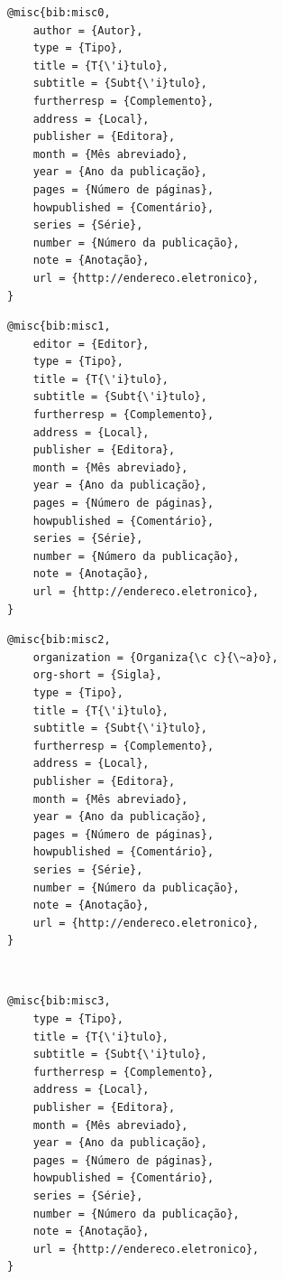 \documentclass[a4paper,12pt,oneside,onecolumn,final,fleqn]{repUERJ}
\begin{document}
\begin{verbatim}
@misc{bib:misc0,
    author = {Autor},
    type = {Tipo},
    title = {T{\'i}tulo},
    subtitle = {Subt{\'i}tulo},
    furtherresp = {Complemento},
    address = {Local},
    publisher = {Editora},
    month = {Mês abreviado},
    year = {Ano da publicação},
    pages = {Número de páginas},
    howpublished = {Comentário},
    series = {Série},
    number = {Número da publicação},
    note = {Anotação},
    url = {http://endereco.eletronico},
}
\end{verbatim}

\noindent{}

\begin{verbatim}
@misc{bib:misc1,
    editor = {Editor},
    type = {Tipo},
    title = {T{\'i}tulo},
    subtitle = {Subt{\'i}tulo},
    furtherresp = {Complemento},
    address = {Local},
    publisher = {Editora},
    month = {Mês abreviado},
    year = {Ano da publicação},
    pages = {Número de páginas},
    howpublished = {Comentário},
    series = {Série},
    number = {Número da publicação},
    note = {Anotação},
    url = {http://endereco.eletronico},
}
\end{verbatim}

\noindent{}

\begin{verbatim}
@misc{bib:misc2,
    organization = {Organiza{\c c}{\~a}o},
    org-short = {Sigla},
    type = {Tipo},
    title = {T{\'i}tulo},
    subtitle = {Subt{\'i}tulo},
    furtherresp = {Complemento},
    address = {Local},
    publisher = {Editora},
    month = {Mês abreviado},
    year = {Ano da publicação},
    pages = {Número de páginas},
    howpublished = {Comentário},
    series = {Série},
    number = {Número da publicação},
    note = {Anotação},
    url = {http://endereco.eletronico},
}
\end{verbatim}

\noindent{}\\

\begin{verbatim}
@misc{bib:misc3,
    type = {Tipo},
    title = {T{\'i}tulo},
    subtitle = {Subt{\'i}tulo},
    furtherresp = {Complemento},
    address = {Local},
    publisher = {Editora},
    month = {Mês abreviado},
    year = {Ano da publicação},
    pages = {Número de páginas},
    howpublished = {Comentário},
    series = {Série},
    number = {Número da publicação},
    note = {Anotação},
    url = {http://endereco.eletronico},
}
\end{verbatim}
\end{document}
